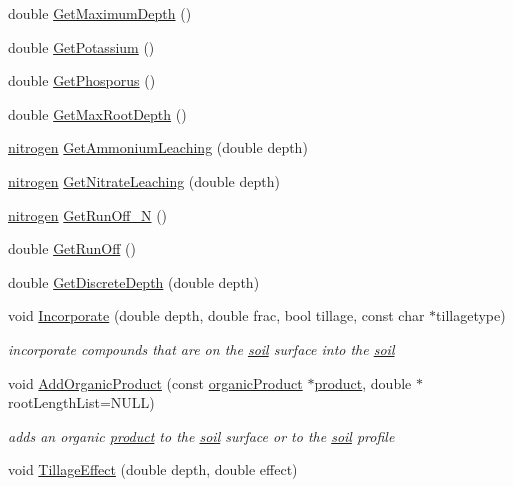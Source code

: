 \begin{DoxyCompactItemize}
\item 
double \hyperlink{classsoil_a36b98f1dc475f9116205d93b64c84b67}{GetMaximumDepth} ()
\item 
double \hyperlink{classsoil_ace8910daf41b497cdf1343ecbfde3e5b}{GetPotassium} ()
\item 
double \hyperlink{classsoil_a9c973ff43a4cc843eea1f8cac178766e}{GetPhosporus} ()
\item 
double \hyperlink{classsoil_a9f4bafd4dfed43438f4310e06dac6933}{GetMaxRootDepth} ()
\item 
\hyperlink{classnitrogen}{nitrogen} \hyperlink{classsoil_a4ed6d8238db0cde0c7ceb073ec61fe83}{GetAmmoniumLeaching} (double depth)
\item 
\hyperlink{classnitrogen}{nitrogen} \hyperlink{classsoil_a349f7aeac285f43f4afb6d35eadcc194}{GetNitrateLeaching} (double depth)
\item 
\hyperlink{classnitrogen}{nitrogen} \hyperlink{classsoil_a97ed6f98d98984975c726e39ecf1aeeb}{GetRunOff\_\-N} ()
\item 
double \hyperlink{classsoil_a8c7642c84b5f177603ca5c4390bac013}{GetRunOff} ()
\item 
double \hyperlink{classsoil_a4b5fc63de9d8e884671531a728275a88}{GetDiscreteDepth} (double depth)
\item 
void \hyperlink{classsoil_a0fcdb4597cdf9804bcb5608a6d99ea5d}{Incorporate} (double depth, double frac, bool tillage, const char $\ast$tillagetype)
\begin{DoxyCompactList}\small\item\em incorporate compounds that are on the \hyperlink{classsoil}{soil} surface into the \hyperlink{classsoil}{soil} \item\end{DoxyCompactList}\item 
void \hyperlink{classsoil_afdc5aef4b05a7077fc613127df6341e7}{AddOrganicProduct} (const \hyperlink{classorganic_product}{organicProduct} $\ast$\hyperlink{classproduct}{product}, double $\ast$rootLengthList=NULL)
\begin{DoxyCompactList}\small\item\em adds an organic \hyperlink{classproduct}{product} to the \hyperlink{classsoil}{soil} surface or to the \hyperlink{classsoil}{soil} profile \item\end{DoxyCompactList}\item 
void \hyperlink{classsoil_aac4bfa4c24d75121fa85d5a133664ee6}{TillageEffect} (double depth, double effect)
\item 

\end{DoxyCompactItemize}
